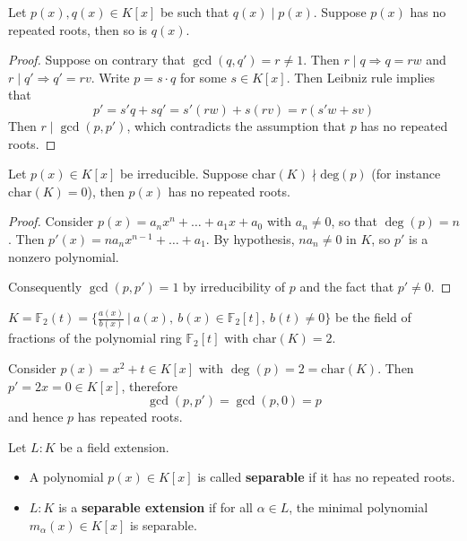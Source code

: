 \begin{lemma} \label{lem-factorseparable}
Let $p(x), q(x) \in K[x]$ be such that $q(x) \mid p(x)$. Suppose $p(x)$ has no repeated roots, then so is $q(x)$.
\end{lemma}

\begin{proof}
Suppose on contrary that $\gcd(q, q') = r \neq 1$. Then $r \mid q  \Rightarrow q = rw$ and $r \mid q' \Rightarrow q'=rv$.
Write $p = s \cdot q$ for some $s \in K[x]$. Then Leibniz rule implies that
$$p' = s'q + sq' = s'(rw) + s(rv) = r(s'w+sv)$$
Then $r \mid \gcd(p, p')$, which contradicts the assumption that $p$ has no repeated roots.
\end{proof}

\begin{proposition} Let $p(x) \in K[x]$ be irreducible. Suppose $\mathrm{char}(K) \nmid \mathrm{deg}(p)$ (for instance $\mathrm{char}(K) = 0$), then $p(x)$ has no repeated roots.
\end{proposition}

\begin{proof}
Consider $p(x) = a_n x^n + \dots + a_1 x + a_0$ with $a_n \neq 0$, so that $\deg(p) = n$. Then $p'(x) = na_n x^{n-1} + \dots + a_1$. By hypothesis, $n a_n \neq 0$ in $K$, so 
$p'$ is a nonzero polynomial.

Consequently $\gcd(p,p') = 1$ by irreducibility of $p$ and the fact that $p' \neq 0$.
\end{proof}

\begin{example} \label{eg-nonsep} 
$K = \mathbb{F}_2(t) = \{ \frac{a(x)}{b(x)}\ |\ a(x),\ b(x) \in \mathbb{F}_2[t],\ b(t) \neq 0\}$ be the field of fractions of the polynomial ring $\mathbb{F}_2[t]$ with $\mathrm{char}(K) = 2$. 

Consider $p(x) = x^2 + t \in K[x]$ with $\deg(p) = 2 = \mathrm{char}(K)$. Then
$p' = 2x = 0 \in K[x]$, therefore
$$\gcd(p,p') = \gcd(p,0) = p$$
and hence $p$ has repeated roots.
\end{example}

\begin{definition} Let $L:K$ be a field extension. 
\begin{itemize}
    \item[(a)] A polynomial $p(x) \in K[x]$ is called \textbf{separable} if it has no repeated roots.
    \item[(b)] $L:K$ is a \textbf{ separable extension} if for all $\alpha \in L$, the minimal polynomial
    $m_{\alpha}(x) \in K[x]$
    is separable.
\end{itemize}
\end{definition}

